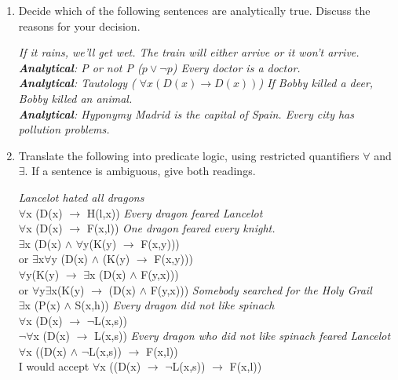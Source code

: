 \documentclass[a4paper]{article}
\newcommand{\ix}{\ex\it}
\newcommand{\into}{\ensuremath{\rightarrow}}
\begin{document}
\begin{enumerate}
\item Decide which of the following sentences are analytically
  true. Discuss the reasons for your decision.
\begin{exe}
  \ix If it rains, we'll get wet. 
  \ix The train will either arrive or it won't arrive.
  \\ \textnormal{\textbf{Analytical}: P or not P ($p \vee \neg p$)}
  \ix Every doctor is a doctor.
  \\ \textnormal{\textbf{Analytical}: Tautology ( $\forall x (D(x) \into D(x))$)}
  \ix If Bobby killed a deer, Bobby killed an animal.
  \\ \textnormal{\textbf{Analytical}: Hyponymy}
  \ix Madrid is the capital of Spain. 
  \ix Every city has pollution problems. 
\end{exe}

\newpage
\item  Translate the following into predicate logic, using restricted
  quantifiers $\forall$ and $\exists$.  If a sentence is ambiguous,
  give both readings.
 \begin{exe}
    \ex \textit{Lancelot hated all dragons} \\
    $\forall$x (D(x)  $\into$ H(l,x))
    \ex \textit{Every dragon feared Lancelot} \\
    $\forall$x (D(x)  $\into$ F(x,l))
    \ex \textit{One dragon feared every knight.} \\
    $\exists$x  (D(x)  $\wedge$ $\forall$y(K(y)  $\into$ F(x,y)))
    \\ or  $\exists$x$\forall$y (D(x)  $\wedge$ (K(y)  $\into$ F(x,y)))
 \\   $\forall$y(K(y)   $\into$ $\exists$x  (D(x)  $\wedge$  F(y,x)))
 \\ or $\forall$y$\exists$x(K(y)   $\into$   (D(x)  $\wedge$  F(y,x)))
    \ex \textit{Somebody searched for the Holy Grail} \\
    $\exists$x  (P(x)  $\wedge$ S(x,h))
    \ex \textit{Every dragon did not like spinach} \\
    $\forall$x (D(x)  $\into$ $\neg$L(x,s))
    \\ $\neg\forall$x (D(x)  $\into$ L(x,s))
    \ex \textit{Every dragon who did not like spinach feared Lancelot} \\
    $\forall$x ((D(x)  $\wedge$ $\neg$L(x,s)) $\into$  F(x,l))
    \\ I would accept  $\forall$x ((D(x)  $\into$ $\neg$L(x,s)) $\into$  F(x,l))


\end{exe}
\end{enumerate}
\end{document}
